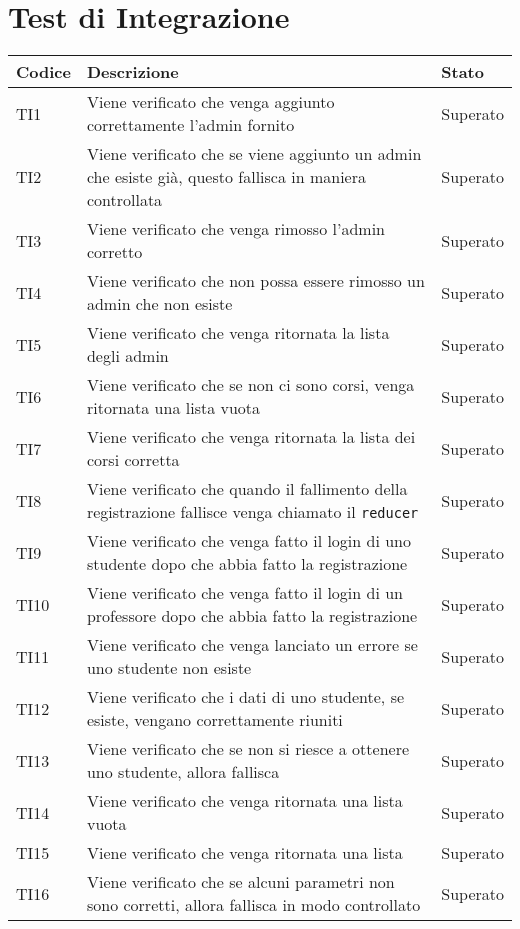 \documentclass[PianoDiQualifica.tex]{subfiles}
\begin{document}
\chapter{Test di Integrazione}

\begin{longtable}[H]{P{2cm}P{8.5cm}P{3cm}}
	\color{CHeaderText}\textbf{Codice} & 
	\color{CHeaderText}\textbf{Descrizione} & 
	\color{CHeaderText}\textbf{Stato}\\
	\endhead
	TI1 & Viene verificato che venga aggiunto correttamente l'admin fornito & Superato \\ 
	TI2 & Viene verificato che se viene aggiunto un admin che esiste già, questo fallisca in maniera controllata & Superato \\
	TI3 & Viene verificato che venga rimosso l'admin corretto & Superato \\
	TI4 & Viene verificato che non possa essere rimosso un admin che non esiste & Superato \\
	TI5 & Viene verificato che venga ritornata la lista degli admin & Superato \\
	TI6 & Viene verificato che se non ci sono corsi, venga ritornata una lista vuota & Superato \\
	TI7 & Viene verificato che venga ritornata la lista dei corsi corretta & Superato \\
	TI8 & Viene verificato che quando il fallimento della registrazione fallisce venga chiamato il \texttt{reducer} & Superato \\
	TI9 & Viene verificato che venga fatto il login di uno studente dopo che abbia fatto la registrazione & Superato \\
	TI10 & Viene verificato che venga fatto il login di un professore dopo che abbia fatto la registrazione & Superato \\
	TI11 & Viene verificato che venga lanciato un errore se uno studente non esiste & Superato \\
	TI12 & Viene verificato che i dati di uno studente, se esiste, vengano correttamente riuniti & Superato \\
	TI13 & Viene verificato che se non si riesce a ottenere uno studente, allora fallisca & Superato \\
	TI14 & Viene verificato che venga ritornata una lista vuota & Superato \\
	TI15 & Viene verificato che venga ritornata una lista & Superato \\
	TI16 & Viene verificato che se alcuni parametri non sono corretti, allora fallisca in modo controllato & Superato \\

\end{longtable}
\end{document}

